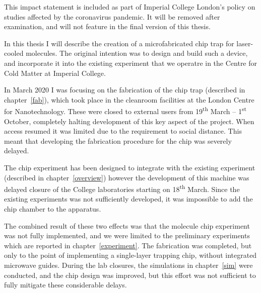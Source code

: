 This impact statement is included as part of Imperial College London's policy
on studies affected by the coronavirus pandemic. It will be removed after
examination, and will not feature in the final version of this thesis.

In this thesis I will describe the creation of a microfabricated chip trap for
laser-cooled \CaF{} molecules. The original intention was to design and build
such a device, and incorporate it into the existing \CaF{} experiment that we
operatre in the Centre for Cold Matter at Imperial College.

In March 2020 I was focusing on the fabrication of the
chip trap (described in chapter~\ref{fab}), which took place in the cleanroom
facilities at the London Centre for Nanotechnology. These were closed to
external users from 19\textsuperscript{th} March -- 1\textsuperscript{st}
October, completely halting development of this key aspect of the project. When
access resumed it was limited due to the requirement to social distance. This
meant that developing the fabrication procedure for the chip was severely
delayed.

The chip experiment has been designed to integrate with the existing \CaF
experiment (described in chapter~\ref{overview}) however the development of
this machine was delayed closure of the College laboratories starting on
18\textsuperscript{th} March. Since the existing experiments was not
sufficiently developed, it was impossible to add the chip chamber to the
apparatus. 

The combined result of these two effects was that the molecule chip experiment
was not fully implemented, and we were limited to the preliminary experiments
which are reported in chapter~\ref{experiment}. The fabrication was completed,
but only to the point of implementing a single-layer trapping chip, without
integrated microwave guides. During the lab closures, the simulations in
chapter~\ref{sim} were conducted, and the chip design was improved, but this
effort was not sufficient to fully mitigate these considerable delays.
